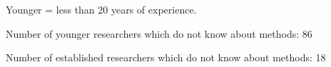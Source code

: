 Younger = less than 20 years of experience. 

Number of younger researchers which do not know about methods: 86

Number of established researchers which do not know about methods: 18

